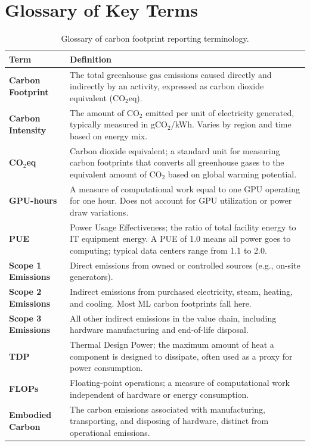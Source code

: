 \documentclass{article}
\theoremstyle{plain}
\theoremstyle{definition}
\theoremstyle{remark}
\begin{document}



\appendix
\onecolumn

\section{Glossary of Key Terms}
\label{app:glossary}

\begin{table}[h]
\caption{Glossary of carbon footprint reporting terminology.}
\label{tab:glossary}
\begin{center}
\begin{tabular}{p{4cm}p{11cm}}
\toprule
\textbf{Term} & \textbf{Definition} \\
\midrule
\textbf{Carbon Footprint} & The total greenhouse gas emissions caused directly and indirectly by an activity, expressed as carbon dioxide equivalent (CO$_2$eq). \\
\textbf{Carbon Intensity} & The amount of CO$_2$ emitted per unit of electricity generated, typically measured in gCO$_2$/kWh. Varies by region and time based on energy mix. \\
\textbf{CO$_2$eq} & Carbon dioxide equivalent; a standard unit for measuring carbon footprints that converts all greenhouse gases to the equivalent amount of CO$_2$ based on global warming potential. \\
\textbf{GPU-hours} & A measure of computational work equal to one GPU operating for one hour. Does not account for GPU utilization or power draw variations. \\
\textbf{PUE} & Power Usage Effectiveness; the ratio of total facility energy to IT equipment energy. A PUE of 1.0 means all power goes to computing; typical data centers range from 1.1 to 2.0. \\
\textbf{Scope 1 Emissions} & Direct emissions from owned or controlled sources (e.g., on-site generators). \\
\textbf{Scope 2 Emissions} & Indirect emissions from purchased electricity, steam, heating, and cooling. Most ML carbon footprints fall here. \\
\textbf{Scope 3 Emissions} & All other indirect emissions in the value chain, including hardware manufacturing and end-of-life disposal. \\
\textbf{TDP} & Thermal Design Power; the maximum amount of heat a component is designed to dissipate, often used as a proxy for power consumption. \\
\textbf{FLOPs} & Floating-point operations; a measure of computational work independent of hardware or energy consumption. \\
\textbf{Embodied Carbon} & The carbon emissions associated with manufacturing, transporting, and disposing of hardware, distinct from operational emissions. \\
\bottomrule
\end{tabular}
\end{center}
\end{table}
\end{document}
